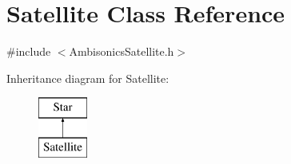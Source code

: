 \hypertarget{class_satellite}{\section{Satellite Class Reference}
\label{class_satellite}
}


{\ttfamily \#include $<$Ambisonics\-Satellite.\-h$>$}

Inheritance diagram for Satellite\-:\begin{figure}[H]
\begin{center}
\leavevmode
\includegraphics[height=2.000000cm]{class_satellite}
\end{center}
\end{figure}
